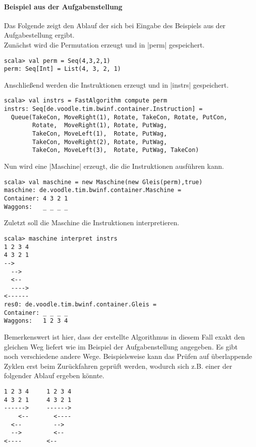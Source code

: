 \paragraph{Beispiel aus der Aufgabenstellung}
Das Folgende zeigt den Ablauf der sich bei Eingabe des Beispiels aus der Aufgabestellung ergibt. \\
Zunächst wird die Permutation erzeugt und in |perm| gespeichert.
\begin{lstlisting}
scala> val perm = Seq(4,3,2,1)               
perm: Seq[Int] = List(4, 3, 2, 1)
\end{lstlisting}
Anschließend werden die Instruktionen erzeugt und in |instrs| gespeichert.
\begin{lstlisting}
scala> val instrs = FastAlgorithm compute perm
instrs: Seq[de.voodle.tim.bwinf.container.Instruction] =
  Queue(TakeCon, MoveRight(1), Rotate, TakeCon, Rotate, PutCon,
        Rotate,  MoveRight(1), Rotate, PutWag,
        TakeCon, MoveLeft(1),  Rotate, PutWag,
        TakeCon, MoveRight(2), Rotate, PutWag,
        TakeCon, MoveLeft(3),  Rotate, PutWag, TakeCon)
\end{lstlisting}
Nun wird eine |Maschine| erzeugt, die die Instruktionen ausführen kann.
\begin{lstlisting}
scala> val maschine = new Maschine(new Gleis(perm),true)
maschine: de.voodle.tim.bwinf.container.Maschine = 
Container: 4 3 2 1
Waggons:   _ _ _ _
\end{lstlisting}
Zuletzt soll die Maschine die Instruktionen interpretieren.
\begin{lstlisting}
scala> maschine interpret instrs                        
1 2 3 4
4 3 2 1
-->
  -->
  <--
  ---->
<------
res0: de.voodle.tim.bwinf.container.Gleis = 
Container: _ _ _ _
Waggons:   1 2 3 4
\end{lstlisting}
Bemerkenswert ist hier, dass der erstellte Algorithmus in diesem Fall exakt den gleichen Weg liefert wie im Beispiel der Aufgabenstellung angegeben.
Es gibt noch verschiedene andere Wege.
Beispielsweise kann das Prüfen auf überlappende Zyklen erst beim Zurückfahren geprüft werden,
wodurch sich z.B. einer der folgender Ablauf ergeben könnte.
\begin{lstlisting}                   
1 2 3 4		1 2 3 4
4 3 2 1		4 3 2 1
------>		------>
    <--		  <----
  <--		  -->
  -->		  <--
<----		<--
\end{lstlisting}
\newpage
